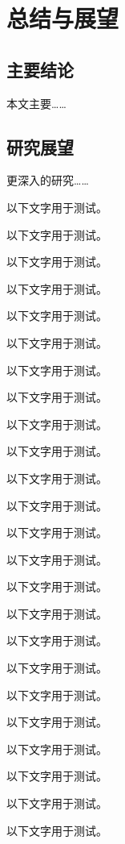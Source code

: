 

\chapter{总结与展望}
\thispagestyle{others}
\pagestyle{others}

\section{主要结论}

本文主要……

\section{研究展望}

更深入的研究……

以下文字用于测试。

以下文字用于测试。

以下文字用于测试。

以下文字用于测试。

以下文字用于测试。

以下文字用于测试。

以下文字用于测试。

以下文字用于测试。

以下文字用于测试。

以下文字用于测试。

以下文字用于测试。

以下文字用于测试。

以下文字用于测试。

以下文字用于测试。

以下文字用于测试。

以下文字用于测试。

以下文字用于测试。

以下文字用于测试。

以下文字用于测试。

以下文字用于测试。

以下文字用于测试。

以下文字用于测试。

以下文字用于测试。

以下文字用于测试。


